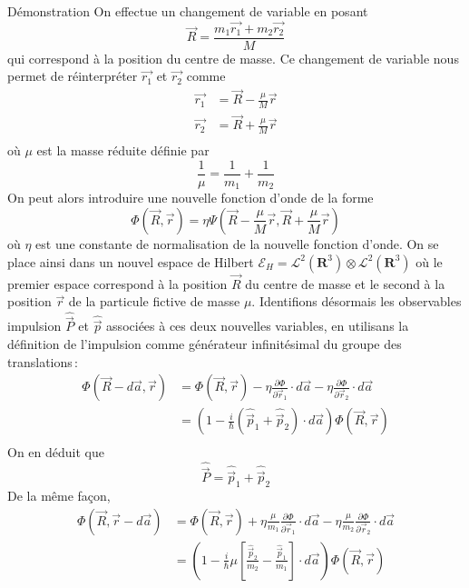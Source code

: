     \begin{demo}{Démonstration}
        On effectue un changement de variable en posant 
        \[ \vec{R} = \frac{m_1 \vec{r_1} + m_2 \vec{r_2}}{M} \]   
        qui correspond à la position du centre de masse. Ce changement de variable nous permet de réinterpréter $\vec{r_1}$ et $\vec{r_2}$ comme
        \begin{align*}
            \vec{r_1} &= \vec{R} - \frac{\mu}{M} \vec{r} \\
            \vec{r_2} &= \vec{R} + \frac{\mu}{M} \vec{r} \\
        \end{align*}
        où $\mu$ est la masse réduite définie par 
        \[ \frac{1}{\mu} = \frac{1}{m_1} + \frac{1}{m_2} \]   
        On peut alors introduire une nouvelle fonction d’onde de la forme 
        \[ \Phi(\vec{R}, \vec{r})= \eta \Psi \left(\vec{R} - \frac{\mu}{M} \vec{r}, \vec{R} + \frac{\mu}{M} \vec{r}\right) \]
        où $\eta$ est une constante de normalisation de la nouvelle fonction d’onde. On se place ainsi dans un nouvel espace de Hilbert $\mathcal{E}_H = \mathcal{L}^2(\mathbf{R}^3) \otimes \mathcal{L}^2(\mathbf{R}^3)$ où le premier espace correspond à la position $\vec{R}$ du centre de masse et le second à la position $\vec{r}$ de la particule fictive de masse $\mu$. Identifions désormais les observables impulsion $\hat{\vec{P}}$ et $\hat{\vec{p}}$ associées à ces deux nouvelles variables, en utilisans la définition de l’impulsion comme générateur infinitésimal du groupe des translations :
        \begin{align*}
            \Phi(\vec{R} - d\vec{a}, \vec{r}) 
            &= \Phi(\vec{R}, \vec{r}) - \eta \frac{\partial \Phi}{\partial \vec{r}_1} \cdot d\vec{a} - \eta \frac{\partial \Phi}{\partial \vec{r}_2} \cdot d\vec{a} \\
            &= \left(1 - \frac{i}{\hbar}(\hat{\vec{p}}_1 + \hat{\vec{p}}_2) \cdot d\vec{a}\right) \Phi(\vec{R}, \vec{r}) \\
        \end{align*}
        On en déduit que 
        \[ \hat{\vec{P}} = \hat{\vec{p}}_1 + \hat{\vec{p}}_2 \] 
        De la même façon, 
        \begin{align*}
            \Phi(\vec{R}, \vec{r} - d\vec{a})
            &= \Phi(\vec{R}, \vec{r}) + \eta \frac{\mu}{m_1} \frac{\partial \Phi}{\partial \vec{r}_1} \cdot d\vec{a} - \eta \frac{\mu}{m_2}\frac{\partial \Phi}{\partial \vec{r}_2} \cdot d\vec{a} \\
            &= \left(1 - \frac{i}{\hbar} \mu \left[\frac{\hat{\vec{p}}_2}{m_2} - \frac{\hat{\vec{p}}_1}{m_1}\right] \cdot d\vec{a}\right) \Phi(\vec{R}, \vec{r}) \\

\end{align*}
\end{demo}

